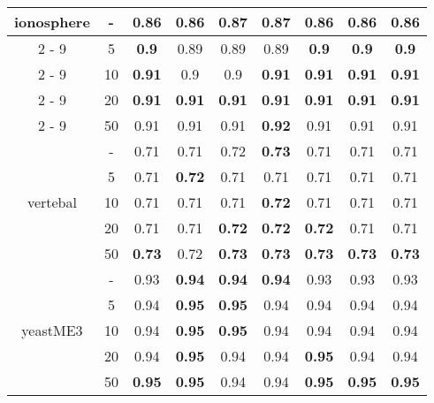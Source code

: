 \documentclass{article}%
\begin{document}
\begin{tabular}{c|c|ccccccc}
\hline%
\multirow{5}{*}{ionosphere}&{-}&0.86&0.86&\textbf{0.87}&\textbf{0.87}&0.86&0.86&0.86\\%
\cline{2%
-%
9}%
&5&\textbf{0.9}&0.89&0.89&0.89&\textbf{0.9}&\textbf{0.9}&\textbf{0.9}\\%
\cline{2%
-%
9}%
&10&\textbf{0.91}&0.9&0.9&\textbf{0.91}&\textbf{0.91}&\textbf{0.91}&\textbf{0.91}\\%
\cline{2%
-%
9}%
&20&\textbf{0.91}&\textbf{0.91}&\textbf{0.91}&\textbf{0.91}&\textbf{0.91}&\textbf{0.91}&\textbf{0.91}\\%
\cline{2%
-%
9}%
&50&0.91&0.91&0.91&\textbf{0.92}&0.91&0.91&0.91\\%
\hline%
\multirow{5}{*}{vertebal}&{-}&0.71&0.71&0.72&\textbf{0.73}&0.71&0.71&0.71\\%
\cline{2%
-%
9}%
&5&0.71&\textbf{0.72}&0.71&0.71&0.71&0.71&0.71\\%
\cline{2%
-%
9}%
&10&0.71&0.71&0.71&\textbf{0.72}&0.71&0.71&0.71\\%
\cline{2%
-%
9}%
&20&0.71&0.71&\textbf{0.72}&\textbf{0.72}&\textbf{0.72}&0.71&0.71\\%
\cline{2%
-%
9}%
&50&\textbf{0.73}&0.72&\textbf{0.73}&\textbf{0.73}&\textbf{0.73}&\textbf{0.73}&\textbf{0.73}\\%
\hline%
\multirow{5}{*}{yeastME3}&{-}&0.93&\textbf{0.94}&\textbf{0.94}&\textbf{0.94}&0.93&0.93&0.93\\%
\cline{2%
-%
9}%
&5&0.94&\textbf{0.95}&\textbf{0.95}&0.94&0.94&0.94&0.94\\%
\cline{2%
-%
9}%
&10&0.94&\textbf{0.95}&\textbf{0.95}&0.94&0.94&0.94&0.94\\%
\cline{2%
-%
9}%
&20&0.94&\textbf{0.95}&0.94&0.94&\textbf{0.95}&0.94&0.94\\%
\cline{2%
-%
9}%
&50&\textbf{0.95}&\textbf{0.95}&0.94&0.94&\textbf{0.95}&\textbf{0.95}&\textbf{0.95}\\%
\hline%
\end{tabular}

%
\end{document}
